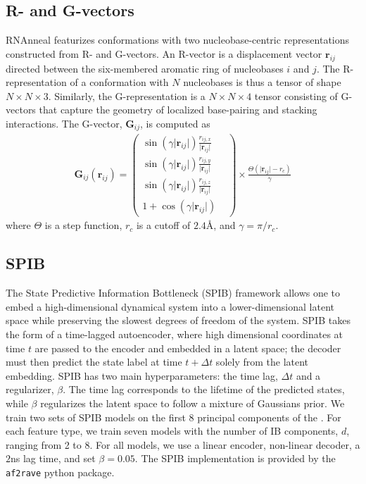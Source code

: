 \documentclass[%
aip,
 amsmath,amssymb,
reprint,%
onecolumn,
]{revtex4-1}
\makeatletter
\newcommand\setcurrentname[1]{\def\@currentlabelname{#1}}
\makeatother
\begin{document}
{\subsection*{R- and G-vectors}
\setcurrentname{R- and G-vectors}
\label{methods:rna-features}
RNAnneal featurizes conformations with two nucleobase-centric representations constructed from R- and G-vectors.\cite{bottaro2014role} An R-vector is a displacement vector $\mathbf{r}_{ij}$ directed between the six-membered aromatic ring of nucleobases $i$ and $j$. The R-representation of a conformation with $N$ nucleobases is thus a tensor of shape $N \times N \times 3$. Similarly, the G-representation is a $N \times N \times 4$
tensor consisting of G-vectors that capture the geometry of localized base-pairing and stacking interactions. The G-vector, $\mathbf{G}_{ij}$, is computed as
\begin{gather}
    \mathbf{G}_{ij}(\mathbf{r}_{ij}) = 
    \begin{pmatrix}
    \sin (\gamma \lvert \mathbf{r}_{ij}\rvert)\frac{r_{ij,x}}{\lvert \mathbf{r}_{ij}\rvert} & \\
    \sin (\gamma \lvert \mathbf{r}_{ij}\rvert)\frac{r_{ij,y}}{\lvert \mathbf{r}_{ij}\rvert} & \\
    \sin (\gamma \lvert \mathbf{r}_{ij}\rvert)\frac{r_{ij,z}}{\lvert \mathbf{r}_{ij}\rvert} &  \\
    1 + \cos (\gamma \lvert \mathbf{r}_{ij}\rvert)
    \end{pmatrix}
    \times \frac{\Theta (\lvert \mathbf{r}_{ij}\rvert - r_c)}{\gamma}
\end{gather}
where $\Theta$ is a step function, $r_c$ is a cutoff of $2.4${\AA}, and $\gamma=\pi/r_c$.

\subsection*{SPIB}
\setcurrentname{SPIB}
\label{methods:spib}

The State Predictive Information Bottleneck (SPIB) framework allows one to embed a high-dimensional dynamical system into a lower-dimensional latent space while preserving the slowest degrees of freedom of the system.\cite{wang2021state} SPIB takes the form of a time-lagged autoencoder, where high dimensional coordinates at time $t$ are passed to the encoder and embedded in a latent space; the decoder must then predict the state label at time $t+\Delta t$ solely from the latent embedding. SPIB has two main hyperparameters: the time lag, $\Delta t$ and a regularizer, $\beta$. The time lag corresponds to the lifetime of the predicted states, while $\beta$ regularizes the latent space to follow a mixture of Gaussians prior. We train two sets of SPIB models on the first 8 principal components of the . For each feature type, we train seven models with the number of IB components, $d$, ranging from 2 to 8. For all models, we use a linear encoder, non-linear decoder, a $2$ns lag time, and set $\beta=0.05$. The SPIB implementation is provided by the \texttt{af2rave} python package.\cite{teng2025alphafold2} 

}
\end{document}
